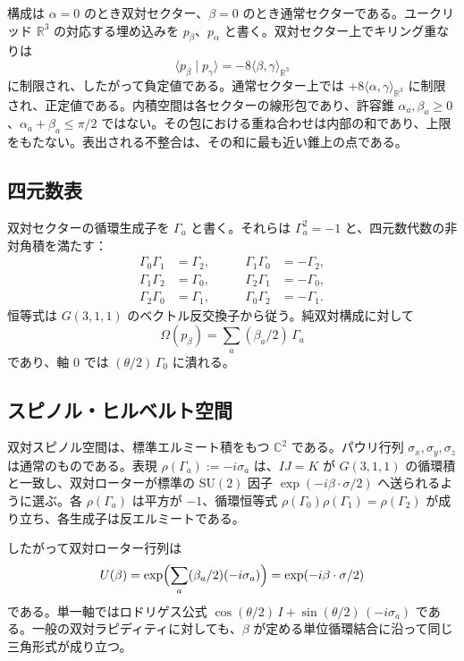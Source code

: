 \documentclass[a4paper]{article}
\theoremstyle{definition}
\begin{document}
構成は \(\alpha=0\) のとき双対セクター、\(\beta=0\) のとき通常セクターである。ユークリッド \(\mathbb{R}^3\) の対応する埋め込みを \(p_\beta\)、\(p_\alpha\) と書く。双対セクター上でキリング重なりは
\[
\langle p_\beta\mid p_\gamma\rangle
=-8\langle\beta,\gamma\rangle_{\mathbb{R}^3}
\]
に制限され、したがって負定値である。通常セクター上では \(+8\langle\alpha,\gamma\rangle_{\mathbb{R}^3}\) に制限され、正定値である。内積空間は各セクターの線形包であり、許容錐 \(\alpha_a,\beta_a\ge 0\)、\(\alpha_a+\beta_a\le\pi/2\) ではない。その包における重ね合わせは内部の和であり、上限をもたない。表出される不整合は、その和に最も近い錐上の点である。

\subsection{四元数表}
\label{sec:quat}

双対セクターの循環生成子を \(\Gamma_a\) と書く。それらは \(\Gamma_a^2=-1\) と、四元数代数の非対角積を満たす：
\[
\begin{aligned}
\Gamma_0\Gamma_1&=\Gamma_2,\\
\Gamma_1\Gamma_2&=\Gamma_0,\\
\Gamma_2\Gamma_0&=\Gamma_1,
\end{aligned}
\qquad
\begin{aligned}
\Gamma_1\Gamma_0&=-\Gamma_2,\\
\Gamma_2\Gamma_1&=-\Gamma_0,\\
\Gamma_0\Gamma_2&=-\Gamma_1.
\end{aligned}
\]
恒等式は \(G(3,1,1)\) のベクトル反交換子から従う。純双対構成に対して
\[
\Omega(p_\beta)=\sum_a(\beta_a/2)\,\Gamma_a
\]
であり、軸 \(0\) では \((\theta/2)\,\Gamma_0\) に潰れる。

\subsection{スピノル・ヒルベルト空間}
\label{sec:spinor}

双対スピノル空間は、標準エルミート積をもつ \(\mathbb{C}^2\) である。パウリ行列 \(\sigma_x,\sigma_y,\sigma_z\) は通常のものである。表現 \(\rho(\Gamma_a):=-i\sigma_a\) は、\(IJ=K\) が \(G(3,1,1)\) の循環積と一致し、双対ローターが標準の \(\mathrm{SU}(2)\) 因子 \(\exp(-i\beta\cdot\sigma/2)\) へ送られるように選ぶ。各 \(\rho(\Gamma_a)\) は平方が \(-1\)、循環恒等式 \(\rho(\Gamma_0)\rho(\Gamma_1)=\rho(\Gamma_2)\) が成り立ち、各生成子は反エルミートである。

したがって双対ローター行列は
\[
U(\beta)
=\exp\Bigl(\sum_a(\beta_a/2)(-i\sigma_a)\Bigr)
=\exp(-i\beta\cdot\sigma/2)
\]
である。単一軸ではロドリゲス公式 \(\cos(\theta/2)\,I+\sin(\theta/2)\,(-i\sigma_a)\) である。一般の双対ラピディティに対しても、\(\beta\) が定める単位循環結合に沿って同じ三角形式が成り立つ。
\end{document}
